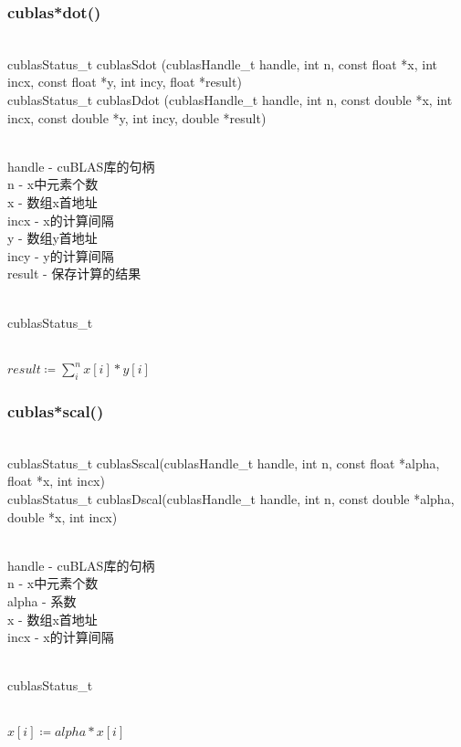 \subsubsection{cublas*dot()}
\begin{cnfrmfunc}
   \item{}\\ 
     cublasStatus\_t cublasSdot (cublasHandle\_t handle, int n,
                                const float *x, int incx,
                                const float *y, int incy,
                                float *result)\\
     cublasStatus\_t cublasDdot (cublasHandle\_t handle, int n,
                                const double *x, int incx,
                                const double *y, int incy,
                                double *result)
   \item{}\\
     handle - cuBLAS库的句柄\\                      
     n - x中元素个数\\
     x - 数组x首地址\\
     incx - x的计算间隔\\
     y - 数组y首地址\\
     incy - y的计算间隔\\
     result - 保存计算的结果
   \item{}\\
     cublasStatus\_t
   \item{}\\
     $result\coloneqq \sum\limits_{i}^{n}x[i]*y[i]$
\end{cnfrmfunc}
\subsubsection{cublas*scal()}
\begin{cnfrmfunc}
   \item{}\\ 
     cublasStatus\_t  cublasSscal(cublasHandle\_t handle, int n,
                                 const float *alpha,
                                 float *x, int incx)\\
     cublasStatus\_t  cublasDscal(cublasHandle\_t handle, int n,
                                 const double *alpha,
                                 double *x, int incx)
   \item{}\\
     handle - cuBLAS库的句柄\\                      
     n - x中元素个数\\
     alpha - 系数\\
     x - 数组x首地址\\
     incx - x的计算间隔\\
   \item{}\\
     cublasStatus\_t
   \item{}\\
     $x[i]\coloneqq alpha * x[i]$
\end{cnfrmfunc}
   

